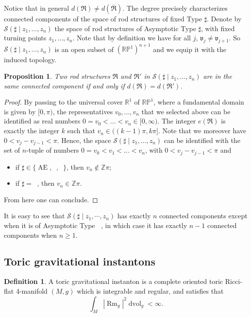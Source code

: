 \documentclass[a4paper,11pt]{amsart}
\newtheorem{proposition}[theorem]{Proposition}
\theoremstyle{definition}
\newtheorem{definition}[theorem]{Definition}
\numberwithin{equation}{section}
\newcommand{\R}{\mathbb{R}}
\newcommand{\dP}{\mathbb{P}}
\DeclareMathOperator{\dvol}{dvol}
\DeclareMathOperator{\Rm}{Rm}
\DeclareMathOperator{\Ae}{AE}
\DeclareMathOperator{\ALFp}{ALF^+}
\DeclareMathOperator{\ALFm}{ALF^{--}}
\DeclareMathOperator{\AFa}{AF_\beta}
\begin{document}
Notice that in general $d(\mathfrak{R})\neq d(\mathfrak{\overline{R}})$. The degree  precisely characterizes connected components of the space of rod structures of fixed Type $\sharp$. Denote by $\mathcal{S}({\sharp\mid z_1,\ldots,z_n})$ the space of rod structures of  Asymptotic Type  $\sharp$, with fixed  turning points $z_1,\ldots,z_n$. Note that by definition we have for all $j$, $\mathfrak{v}_j\neq\mathfrak{v}_{j+1}$. So $\mathcal{S}({\sharp\mid z_1,\ldots,z_n})$ is an open subset of $(\mathbb R\dP^1)^{n+1}$ and we equip it with the induced topology.
\begin{proposition}\label{p:degreee topological invariant}
    Two rod structures $\mathfrak{R}$ and $\mathfrak{R}'$ in $\mathcal{S}(\sharp\mid z_1,\ldots,z_n)$ are in the same connected component if and only if $d(\mathfrak R)=d(\mathfrak R')$.

    
\end{proposition}
\begin{proof}
    By passing to the universal cover $\R^1$ of $\mathbb{RP}^1$, where a fundamental domain is given by $[0,\pi)$, the representatives $v_0,\ldots,v_n$ that we selected above can be identified as real numbers $0=v_0<\ldots<v_n\in[0,\infty)$. The integer $e(\mathfrak{R})$ is exactly the integer $k$ such that $v_n\in((k-1)\pi,k\pi]$. Note that we moreover have $0<v_j-v_{j-1}<\pi$. Hence, the space $\mathcal{S}(\sharp\mid z_1,\ldots,z_n)$ can be identified with the set of $n$-tuple of numbers $0=v_0<v_1<\ldots<v_n$, with $0<v_j-v_{j-1}<\pi$ and 
    \begin{itemize}
        \item if $\sharp\in\{\Ae, \ALFp, \ALFm\}$, then $v_n\not\in\mathbb{Z}\pi$;
        \item if $\sharp=\AFa$, then $v_n\in\mathbb{Z}\pi$.
    \end{itemize}
From here one can conclude.
\end{proof}
It is easy to see that $\mathcal S(\sharp\mid z_1, \cdots, z_n)$ has exactly $n$ connected components except when it is of Asymptotic Type $\AFa$, in which case it has exactly $n-1$ connected components when $n\geq1$. 




\subsection{Toric gravitational instantons}
\begin{definition}
	A toric gravitational instanton is a complete oriented toric Ricci-flat 4-manifold $(M,g)$ which is  integrable and regular, and satisfies that $$\int_{M}|\Rm_g|^2\dvol_g<\infty.$$ 
\end{definition}
\end{document}
